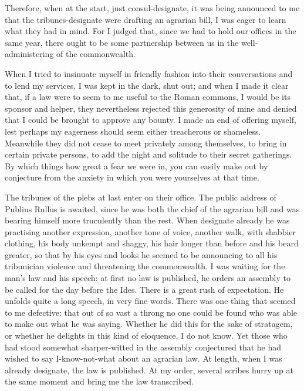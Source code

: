  Therefore, when at the start, just consul-designate, it was being announced to me that the tribunes-designate were drafting an agrarian bill, I was eager to learn what they had in mind. For I judged that, since we had to hold our offices in the same year, there ought to be some partnership between us in the well-administering of the commonwealth.

 When I tried to insinuate myself in friendly fashion into their conversations and to lend my services, I was kept in the dark, shut out; and when I made it clear that, if a law were to seem to me useful to the Roman commons, I would be its sponsor and helper, they nevertheless rejected this generosity of mine and denied that I could be brought to approve any bounty. I made an end of offering myself, lest perhaps my eagerness should seem either treacherous or shameless. Meanwhile they did not cease to meet privately among themselves, to bring in certain private persons, to add the night and solitude to their secret gatherings. By which things how great a fear we were in, you can easily make out by conjecture from the anxiety in which you were yourselves at that time.

 The tribunes of the plebs at last enter on their office. The public address of Publius Rullus is awaited, since he was both the chief of the agrarian bill and was bearing himself more truculently than the rest. When designate already he was practising another expression, another tone of voice, another walk, with shabbier clothing, his body unkempt and shaggy, his hair longer than before and his beard greater, so that by his eyes and looks he seemed to be announcing to all his tribunician violence and threatening the commonwealth. I was waiting for the man's law and his speech: at first no law is published, he orders an assembly to be called for the day before the Ides. There is a great rush of expectation. He unfolds quite a long speech, in very fine words. There was one thing that seemed to me defective: that out of so vast a throng no one could be found who was able to make out what he was saying. Whether he did this for the sake of stratagem, or whether he delights in this kind of eloquence, I do not know. Yet those who had stood somewhat sharper-witted in the assembly conjectured that he had wished to say I-know-not-what about an agrarian law. At length, when I was already designate, the law is published. At my order, several scribes hurry up at the same moment and bring me the law transcribed.

